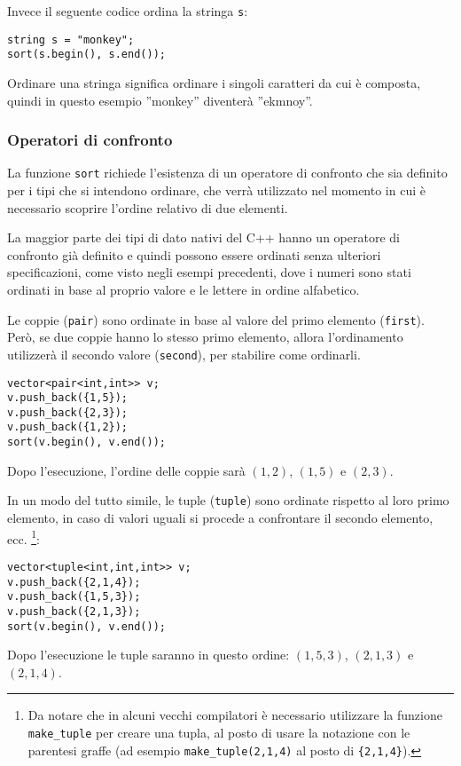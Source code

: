 Invece il seguente codice ordina la stringa \texttt{s}:
\begin{lstlisting}
string s = "monkey";
sort(s.begin(), s.end());
\end{lstlisting}
Ordinare una stringa significa ordinare i singoli
caratteri da cui è composta, quindi in questo esempio
''monkey'' diventerà ''ekmnoy''.

\subsubsection{Operatori di confronto}


La funzione \texttt{sort} richiede l'esistenza di un operatore 
di confronto che sia definito per i tipi che si intendono ordinare,
che verrà utilizzato nel momento in cui è necessario scoprire
l'ordine relativo di due elementi.

La maggior parte dei tipi di dato nativi del C++
hanno un operatore di confronto già definito e quindi
possono essere ordinati senza ulteriori specificazioni, 
come visto negli esempi precedenti, dove i numeri sono stati
ordinati in base al proprio valore e le lettere in ordine
alfabetico.


Le coppie (\texttt{pair}) sono ordinate in base al valore del primo elemento (\texttt{first}).
Però, se due coppie hanno lo stesso primo elemento, allora
l'ordinamento utilizzerà il secondo valore (\texttt{second}), per stabilire come ordinarli.
\begin{lstlisting}
vector<pair<int,int>> v;
v.push_back({1,5});
v.push_back({2,3});
v.push_back({1,2});
sort(v.begin(), v.end());
\end{lstlisting}
Dopo l'esecuzione, l'ordine delle coppie sarà
$(1,2)$, $(1,5)$ e $(2,3)$.


In un modo del tutto simile, le tuple (\texttt{tuple})
sono ordinate rispetto al loro primo elemento,
in caso di valori uguali si procede a confrontare il secondo elemento, ecc.
\footnote{Da notare che in alcuni vecchi compilatori è necessario utilizzare
la funzione \texttt{make\_tuple} per creare una tupla, al posto di usare la
notazione con le parentesi graffe (ad esempio \texttt{make\_tuple(2,1,4)} 
al posto di \texttt{\{2,1,4\}}).}:
\begin{lstlisting}
vector<tuple<int,int,int>> v;
v.push_back({2,1,4});
v.push_back({1,5,3});
v.push_back({2,1,3});
sort(v.begin(), v.end());
\end{lstlisting}
Dopo l'esecuzione le tuple saranno in questo ordine:
$(1,5,3)$, $(2,1,3)$ e $(2,1,4)$.

